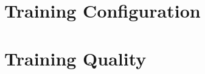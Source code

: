 \documentclass{article}
\begin{document}
\FloatBarrier
\clearpage

\section{Training Configuration}\label{sec-training-config}

\begin{table}[H]


\caption{\label{tbl-models}Training configuration for all six models.
All models use the OPT architecture, a shared BPE tokenizer (vocab
8,192; context 1,024 tokens), AdamW optimization, and a linear LR
schedule with 4,000 warmup steps.}

\end{table}%

\FloatBarrier

\section{Training Quality}\label{sec-training-quality}
\end{document}
